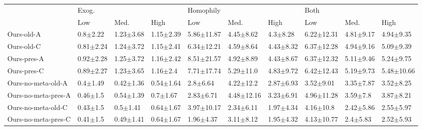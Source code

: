 \begin{tabular}{llllllllll}
\toprule
{} & \multicolumn{3}{l}{Exog.} & \multicolumn{3}{l}{Homophily} & \multicolumn{3}{l}{Both} \\
{} &                     Low &                    Med. &                    High &                     Low &                    Med. &                    High &                     Low &                    Med. &                   High \\
\midrule
Ours-old-A          &            0.8$\pm$2.22 &           1.23$\pm$3.68 &           1.15$\pm$2.39 &          5.86$\pm$11.87 &           4.45$\pm$8.62 &            4.3$\pm$8.28 &          6.22$\pm$12.31 &           4.81$\pm$9.17 &          4.94$\pm$9.35 \\
Ours-old-C          &           0.81$\pm$2.24 &           1.24$\pm$3.72 &           1.15$\pm$2.41 &          6.34$\pm$12.21 &           4.59$\pm$8.64 &           4.43$\pm$8.32 &          6.37$\pm$12.28 &           4.94$\pm$9.16 &          5.09$\pm$9.39 \\
Ours-pres-A         &           0.92$\pm$2.28 &           1.25$\pm$3.72 &           1.16$\pm$2.42 &          8.51$\pm$21.57 &           4.92$\pm$8.89 &           4.43$\pm$8.67 &          6.37$\pm$12.32 &           5.11$\pm$9.46 &          5.24$\pm$9.75 \\
Ours-pres-C         &           0.89$\pm$2.27 &           1.23$\pm$3.65 &            1.16$\pm$2.4 &          7.71$\pm$17.74 &           5.29$\pm$11.0 &           4.83$\pm$9.72 &          6.42$\pm$12.43 &           5.19$\pm$9.73 &         5.48$\pm$10.66 \\
Ours-no-meta-old-A  &            0.4$\pm$1.49 &           0.42$\pm$1.36 &           0.54$\pm$1.64 &            2.8$\pm$6.64 &           4.22$\pm$12.2 &           2.87$\pm$6.93 &           3.52$\pm$9.01 &           3.35$\pm$7.87 &          3.52$\pm$8.25 \\
Ours-no-meta-pres-A &            0.46$\pm$1.5 &           0.54$\pm$1.39 &            0.7$\pm$1.67 &           2.83$\pm$6.71 &          4.48$\pm$12.16 &           3.23$\pm$6.91 &          4.96$\pm$11.28 &            3.59$\pm$7.8 &          3.87$\pm$8.21 \\
Ours-no-meta-old-C  &            0.43$\pm$1.5 &            0.5$\pm$1.41 &           0.64$\pm$1.67 &          3.97$\pm$10.17 &           2.34$\pm$6.11 &           1.97$\pm$4.34 &           4.16$\pm$10.8 &           2.42$\pm$5.86 &          2.55$\pm$5.97 \\
Ours-no-meta-pres-C &            0.41$\pm$1.5 &           0.49$\pm$1.41 &           0.64$\pm$1.67 &           1.96$\pm$4.37 &           3.11$\pm$8.12 &           1.95$\pm$4.32 &          4.13$\pm$10.77 &            2.4$\pm$5.83 &          2.52$\pm$5.93 \\

\end{tabular}
